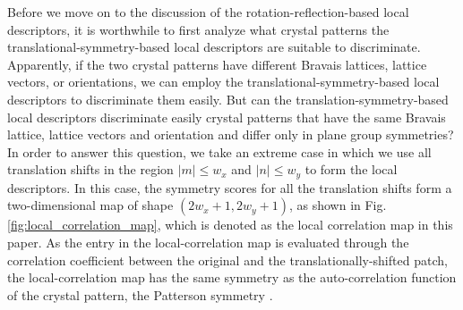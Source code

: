 \documentclass[twocolumn,amsmath, floatfix]{revtex4}
\begin{document}
Before we move on to the discussion of the rotation-reflection-based local descriptors, it is worthwhile to first analyze what crystal patterns the translational-symmetry-based local descriptors are suitable to discriminate. Apparently, if the two crystal patterns have different Bravais lattices, lattice vectors, or orientations, we can employ the translational-symmetry-based local descriptors to discriminate them easily. But can the translation-symmetry-based local descriptors discriminate easily  crystal patterns that have the same Bravais lattice, lattice vectors and orientation and differ only in plane group symmetries? In order to answer this question, we take an extreme case in which we use all translation shifts in the region $ |m|\leq w_x$ and  $ |n|\leq w_y$ to form the local descriptors. In this case, the symmetry scores for all the translation shifts  form a two-dimensional map of shape $(2w_x+1, 2w_y+1)$, as shown in Fig. \ref{fig:local_correlation_map}, which is denoted as the local correlation map in this paper. 
As the entry in the local-correlation map is evaluated through the correlation coefficient between the original and the translationally-shifted patch, the local-correlation map has the same symmetry as the auto-correlation function of the crystal pattern, the Patterson symmetry \cite{ITA2002}.
\end{document}
